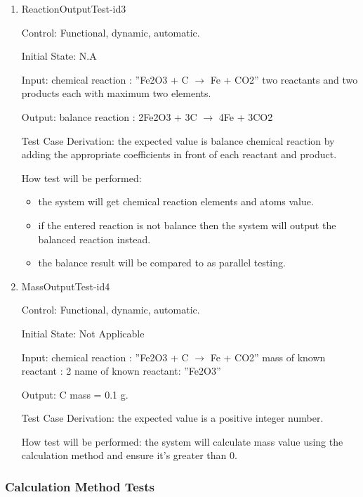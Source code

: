 \documentclass[12pt, titlepage]{article}
\begin{document}
\begin{enumerate}

\item{ReactionOutputTest-id3\\}

Control: Functional, dynamic, automatic.
					
Initial State: N.A
					
Input: 
chemical reaction : ”Fe2O3 + C $\rightarrow$ Fe + CO2”
two reactants and two products each with maximum two elements.
	
Output: balance reaction : 2Fe2O3 + 3C $\rightarrow$ 4Fe + 3CO2

Test Case Derivation: the expected value is balance chemical reaction by adding the appropriate coefficients in front of each reactant and product.

How test will be performed: 
\begin{itemize}
\item the system will get chemical reaction elements and atoms value. 
\item if the entered reaction is not balance then the system will output the balanced reaction instead. 
\item the balance result will be compared to \cite{OnlineBalancer} as parallel testing.
\end{itemize}


\item{MassOutputTest-id4\\}

Control: Functional, dynamic, automatic.
					
Initial State: Not Applicable
					
Input:
\newline
chemical reaction : ”Fe2O3 + C $\rightarrow$ Fe + CO2”
\newline
mass of known reactant : 2
\newline
name of known reactant: ”Fe2O3”
				
Output: C mass = 0.1 g. 

Test Case Derivation: the expected value is a positive integer number. 
					
How test will be performed: 
the system will calculate mass value using the calculation method and ensure it's greater than 0.
 


\end{enumerate}	

\subsubsection{Calculation Method Tests}
\end{document}
